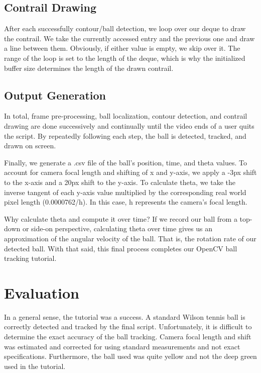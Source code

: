 \documentclass[10pt,twocolumn]{article}
\begin{document}
\subsection{Contrail Drawing}
After each successfully contour/ball detection, we loop over our deque to draw the contrail.
We take the currently accessed entry and the previous one and draw a line between them.
Obviously, if either value is empty, we skip over it.
The range of the loop is set to the length of the deque, which is why the initialized buffer size determines the length of the drawn contrail. \par

\subsection{Output Generation}
In total, frame pre-processing, ball localization, contour detection, and contrail drawing are done successively and continually until the video ends of a user quits the script.
By repeatedly following each step, the ball is detected, tracked, and drawn on screen. \par

Finally, we generate a .csv file of the ball's position, time, and theta values.
To account for camera focal length and shifting of x and y-axis, we apply a -3px shift to the x-axis and a 20px shift to the y-axis.
To calculate theta, we take the inverse tangent of each y-axis value multiplied by the corresponding real world pixel length (0.0000762/h).
In this case, h represents the camera's focal length. \par

Why calculate theta and compute it over time?
If we record our ball from a top-down or side-on perspective, calculating theta over time gives us an approximation of the angular velocity of the ball.
That is, the rotation rate of our detected ball.
With that said, this final process completes our OpenCV ball tracking tutorial.

\section{Evaluation}
In a general sense, the tutorial was a success.
A standard Wilson tennis ball is correctly detected and tracked by the final script.
Unfortunately, it is difficult to determine the exact accuracy of the ball tracking.
Camera focal length and shift was estimated and corrected for using standard measurements and not exact specifications.
Furthermore, the ball used was quite yellow and not the deep green used in the tutorial. \par
\end{document}
